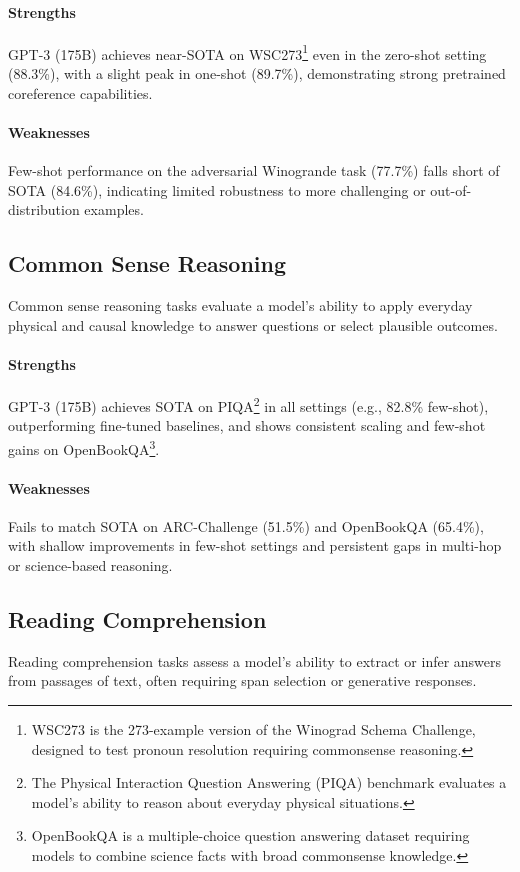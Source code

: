 \documentclass[10pt]{article}
\begin{document}
\paragraph{Strengths}
GPT-3 (175B) achieves near-SOTA on WSC273\footnote{WSC273 is the 273-example version of the Winograd Schema Challenge, designed to test pronoun resolution requiring commonsense reasoning.} even in the zero-shot setting (88.3\%), with a slight peak in one-shot (89.7\%), demonstrating strong pretrained coreference capabilities.

\paragraph{Weaknesses}
Few-shot performance on the adversarial Winogrande task (77.7\%) falls short of SOTA (84.6\%), indicating limited robustness to more challenging or out-of-distribution examples.


\subsection*{Common Sense Reasoning}
Common sense reasoning tasks evaluate a model's ability to apply everyday physical and causal knowledge to answer questions or select plausible outcomes.

\paragraph{Strengths}
GPT-3 (175B) achieves SOTA on PIQA\footnote{The Physical Interaction Question Answering (PIQA) benchmark evaluates a model's ability to reason about everyday physical situations.} in all settings (e.g., 82.8\% few-shot), outperforming fine-tuned baselines, and shows consistent scaling and few-shot gains on OpenBookQA\footnote{OpenBookQA is a multiple-choice question answering dataset requiring models to combine science facts with broad commonsense knowledge.}.

\paragraph{Weaknesses}
Fails to match SOTA on ARC-Challenge (51.5\%) and OpenBookQA (65.4\%), with shallow improvements in few-shot settings and persistent gaps in multi-hop or science-based reasoning.


\subsection*{Reading Comprehension}
Reading comprehension tasks assess a model's ability to extract or infer answers from passages of text, often requiring span selection or generative responses.
\end{document}
